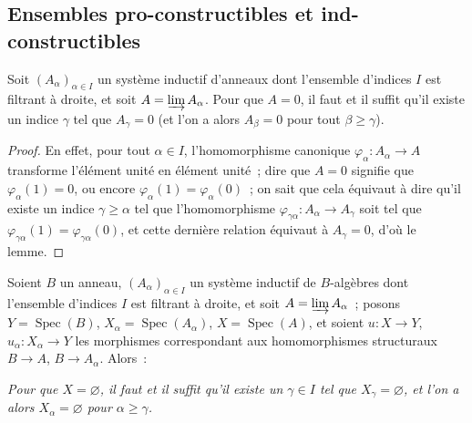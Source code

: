 \subsection{Ensembles pro-constructibles et ind-constructibles}
\label{subsection:IV.1.9-fr}

\begin{lemma}[1.9.1]
\label{IV.1.9.1-fr}
Soit $(A_\alpha)_{\alpha\in I}$ un système inductif d'anneaux dont l'ensemble
d'indices $I$ est filtrant à droite, et soit $A=\varinjlim A_\alpha$. Pour que
$A=0$, il faut et il suffit qu'il existe un indice $\gamma$ tel que
$A_\gamma=0$ (et l'on a alors $A_\beta=0$ pour tout $\beta\geq\gamma$).
\end{lemma}

\begin{proof}
En effet, pour tout $\alpha\in I$, l'homomorphisme canonique
$\varphi_\alpha:A_\alpha\to A$ transforme l'élément unité en élément unité~;
dire que $A=0$ signifie que $\varphi_\alpha(1)=0$, ou encore
$\varphi_\alpha(1)=\varphi_\alpha(0)$~; on sait que cela équivaut à dire
qu'il existe un indice $\gamma\geq\alpha$ tel que l'homomorphisme
$\varphi_{\gamma\alpha}:A_\alpha\to A_\gamma$ soit tel que
$\varphi_{\gamma\alpha}(1)=\varphi_{\gamma\alpha}(0)$, et cette dernière
relation équivaut à $A_\gamma=0$, d'où le lemme.
\end{proof}

\begin{proposition}[1.9.2]
\label{IV.1.9.2-fr}
Soient $B$ un anneau, $(A_\alpha)_{\alpha\in I}$ un système inductif de
$B$-algèbres dont l'ensemble d'indices $I$ est filtrant à droite, et soit
$A=\varinjlim A_\alpha$~; posons $Y=\operatorname{Spec}(B)$,
$X_\alpha=\operatorname{Spec}(A_\alpha)$, $X=\operatorname{Spec}(A)$, et
soient $u:X\to Y$, $u_\alpha:X_\alpha\to Y$ les morphismes correspondant aux
homomorphismes structuraux $B\to A$, $B\to A_\alpha$. Alors~:
\end{proposition}

\begin{env}[1.9.2.i]
\label{IV.1.9.2.i-fr}
\emph{Pour que $X=\varnothing$, il faut et il suffit qu'il existe un
$\gamma\in I$ tel que $X_\gamma=\varnothing$, et l'on a alors
$X_\alpha=\varnothing$ pour $\alpha\geq\gamma$.}
\end{env}

